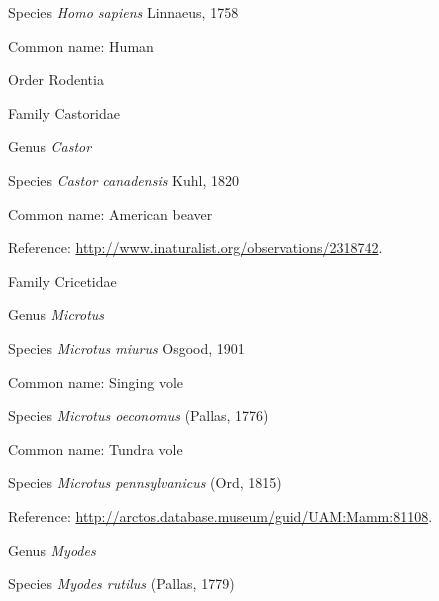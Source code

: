 \documentclass[9pt, article]{memoir}
\begin{document}
\begin{multicols}{2}
\vspace{6pt}\noindent\hspace{36pt}Species \textit{Homo sapiens} Linnaeus, 1758


Common name: Human

\vspace{6pt}\noindent\hspace{18pt}Order Rodentia


\vspace{6pt}\noindent\hspace{24pt}Family Castoridae


\vspace{6pt}\noindent\hspace{30pt}Genus \textit{Castor}


\vspace{6pt}\noindent\hspace{36pt}Species \textit{Castor canadensis} Kuhl, 1820


Common name: American beaver

Reference: 
\url{http://www.inaturalist.org/observations/2318742}.

\vspace{6pt}\noindent\hspace{24pt}Family Cricetidae


\vspace{6pt}\noindent\hspace{30pt}Genus \textit{Microtus}


\vspace{6pt}\noindent\hspace{36pt}Species \textit{Microtus miurus} Osgood, 1901


Common name: Singing vole

\vspace{6pt}\noindent\hspace{36pt}Species \textit{Microtus oeconomus} (Pallas, 1776)


Common name: Tundra vole

\vspace{6pt}\noindent\hspace{36pt}Species \textit{Microtus pennsylvanicus} (Ord, 1815)


Reference: 
\url{http://arctos.database.museum/guid/UAM:Mamm:81108}.

\vspace{6pt}\noindent\hspace{30pt}Genus \textit{Myodes}


\vspace{6pt}\noindent\hspace{36pt}Species \textit{Myodes rutilus} (Pallas, 1779)



\end{multicols}
\end{document}
